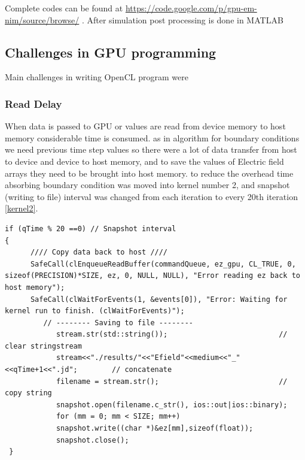 Complete codes can be found at \url{https://code.google.com/p/gpu-em-nim/source/browse/}
. After simulation post processing is done in MATLAB
\subsection {Challenges in GPU programming}
Main challenges in writing OpenCL program were

\subsubsection{Read Delay}
When data is passed to GPU or values are read from device memory to host memory considerable time is consumed. as in algorithm for boundary conditions we need previous time step values so there were a lot of data transfer from host to device and device to host memory, and to save the values of Electric field arrays they need to be brought into host memory. to reduce the overhead time absorbing boundary condition was moved into kernel number 2, and snapshot (writing to file) interval was changed from each iteration to every 20th iteration \ref{kernel2}.
\lstset{language=C,caption=OpenCL saving Efield values in files, label=kernel2}
\begin{lstlisting}
if (qTime % 20 ==0) // Snapshot interval
{
      //// Copy data back to host ////
      SafeCall(clEnqueueReadBuffer(commandQueue, ez_gpu, CL_TRUE, 0,  sizeof(PRECISION)*SIZE, ez, 0, NULL, NULL), "Error reading ez back to host memory");    
      SafeCall(clWaitForEvents(1, &events[0]), "Error: Waiting for kernel run to finish. (clWaitForEvents)");
         // -------- Saving to file -------- 
			stream.str(std::string());   						// clear stringstream
			stream<<"./results/"<<"Efield"<<medium<<"_"<<qTime+1<<".jd";   		// concatenate
			filename = stream.str();		 					// copy string
			snapshot.open(filename.c_str(), ios::out|ios::binary);
			for (mm = 0; mm < SIZE; mm++)
			snapshot.write((char *)&ez[mm],sizeof(float));
			snapshot.close();
 } 
\end{lstlisting}

